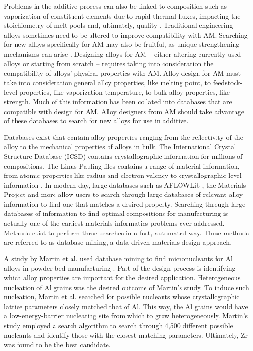 Problems in the additive process can also be linked to composition such as vaporization of constituent elements due to rapid thermal fluxes, impacting the stoichiometry of melt pools and, ultimately, quality \cite{Brice2018}. Traditional engineering alloys sometimes need to be altered to improve compatibility with AM. Searching for new alloys specifically for AM may also be fruitful, as unique strengthening mechanisms can arise \cite{Brice2018, Wang2017}. Designing alloys for AM -- either altering currently used alloys or starting from scratch -- requires taking into consideration the compatibility of alloys' physical properties with AM. Alloy design for AM must take into consideration general alloy properties, like melting point, to feedstock-level properties, like vaporization temperature, to bulk alloy properties, like strength. Much of this information has been collated into databases that are compatible with design for AM. Alloy designers from AM should take advantage of these databases to search for new alloys for use in additive. 

Databases exist that contain alloy properties ranging from the reflectivity of the alloy to the mechanical properties of alloys in bulk. The International Crystal Structure Database (ICSD) contains crystallographic information for millions of compositions. The Linus Pauling files contains a range of material information, from atomic properties like radius and electron valency to crystallographic level information \cite{Villars1998}. In modern day, large databases such as AFLOWLib \cite{Curtarolo2012a}, the Materials Project \cite{Jain2013} and more allow users to search through large databases of relevant alloy information to find one that matches a desired property. Searching through large databases of information to find optimal compositions for manufacturing is actually one of the earliest materials informatics problems ever addressed. Methods exist to perform these searches in a fast, automated way. These methods are referred to as database mining, a data-driven materials design approach.

A study by Martin et al. used database mining to find micronucleants for Al alloys in powder bed manufacturing \cite{Martin2017}. Part of the design process is identifying which alloy properties are important for the desired application. Heterogeneous nucleation of Al grains was the desired outcome of Martin's study. To induce such nucleation, Martin et al. searched for possible nucleants whose crystallographic lattice parameters closely matched that of Al. This way, the Al grains would have a low-energy-barrier nucleating site from which to grow heterogeneously. Martin's study employed a search algorithm to search through 4,500 different possible nucleants and identify those with the closest-matching parameters. Ultimately, Zr was found to be the best candidate.

